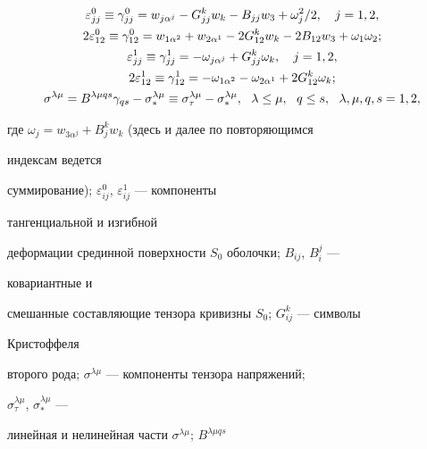 \begin{gather} 


\varepsilon^0_{jj}\equiv\gamma^0_{jj}=w_{j\alpha^j} 


-G^k_{jj}w_k-B_{jj}w_3+\omega^2_j/2,\quad j=1,2,\notag \\ 


% 


2\varepsilon^0_{12}\equiv\gamma^0_{12}=w_{1\alpha^2} 


+w_{2\alpha^1}-2G^k_{12}w_k-2B_{12}w_3+\omega_1\omega_2;\notag \\ 


% 


\varepsilon^1_{jj}\equiv\gamma^1_{jj}=-\omega_{j\alpha^j} 


+G^k_{jj}\omega_k,\quad j=1,2, \\ 


2\varepsilon^1_{12}\equiv\gamma^1_{12}=-\omega_{1\alpha^2} 


-\omega_{2\alpha^1}+2G^k_{12}\omega_k;\notag \\ 


% 


\sigma^{\lambda\mu}=B^{\lambda\mu qs}\gamma_{qs} 


-\sigma^{\lambda\mu}_*\equiv\sigma^{\lambda\mu}_\tau 


-\sigma^{\lambda\mu}_*,\ \ \lambda\le\mu, 


\ \ q\le s,\ \ \lambda,\mu,q,s=1,2, 


\end{gather} 


где $\omega_j=w_{3\alpha^j}+B^k_j w_k$ (здесь и далее по повторяющимся 


индексам ведется 


суммирование); $\varepsilon^0_{ij}$, $\varepsilon^1_{ij}$ --- компоненты 


тангенциальной и изгибной 


деформации срединной поверхности $S_0$ оболочки; $B_{ij}$, $B^j_i$ --- 


ковариантные и 


смешанные составляющие тензора кривизны $S_0$; $G^k_{ij}$ --- символы 


Кристоффеля 


второго рода; $\sigma^{\lambda\mu}$ --- компоненты тензора напряжений; 


$\sigma^{\lambda\mu}_\tau$, $\sigma^{\lambda\mu}_*$ --- 


линейная и нелинейная части $\sigma^{\lambda\mu}$; $B^{\lambda\mu qs}$ 


